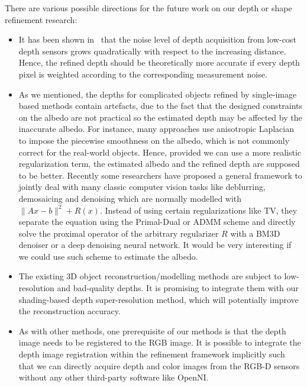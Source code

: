 There are various possible directions for the future work on our depth or shape refinement research:
\begin{itemize}
    \item It has been shown in~\cite{khoshelham2012accuracy} that the noise level of depth acquisition from low-cost depth sensors grows quadratically with respect to the increasing distance.
    Hence, the refined depth should be theoretically more accurate if every depth pixel is weighted according to the corresponding measurement noise.
    
    \item As we mentioned, the depths for complicated objects refined by single-image based methods contain artefacts, due to the fact that the designed constraints on the albedo are not practical so the estimated depth may be affected by the inaccurate albedo.
    For instance, many approaches use anisotropic Laplacian to impose the piecewise smoothness on the albedo, which is not commonly correct for the real-world objects.
    Hence, provided we can use a more realistic regularization term, the estimated albedo and the refined depth are supposed to be better.
    Recently some researchers have proposed a general framework to jointly deal with many classic computer vision tasks like deblurring, demosaicing and denoising which are normally modelled with $\lVert Ax - b\rVert^2 + R(x)$.
    Instead of using certain regularizations like TV, they separate the equation using the Primal-Dual or ADMM scheme and directly solve the proximal operator of the arbitrary regularizer $R$ with a BM3D denoiser\cite{heide2014flexisp} or a deep denoising neural network\cite{meinhardt2017learning}.
    It would be very interesting if we could use such scheme to estimate the albedo. 

    \item The existing 3D object reconstruction/modelling methods are subject to low-resolution and bad-quality depths.
             It is promising to integrate them with our shading-based depth super-resolution method, which will potentially improve the reconstruction accuracy.   
     
    \item As with other methods, one prerequisite of our methods is that the depth image needs to be registered to the RGB image.
    It is possible to integrate the depth image registration within the refinement framework implicitly such that we can directly acquire depth and color images from the RGB-D sensors without any other third-party software like OpenNI.
             
\end{itemize}







